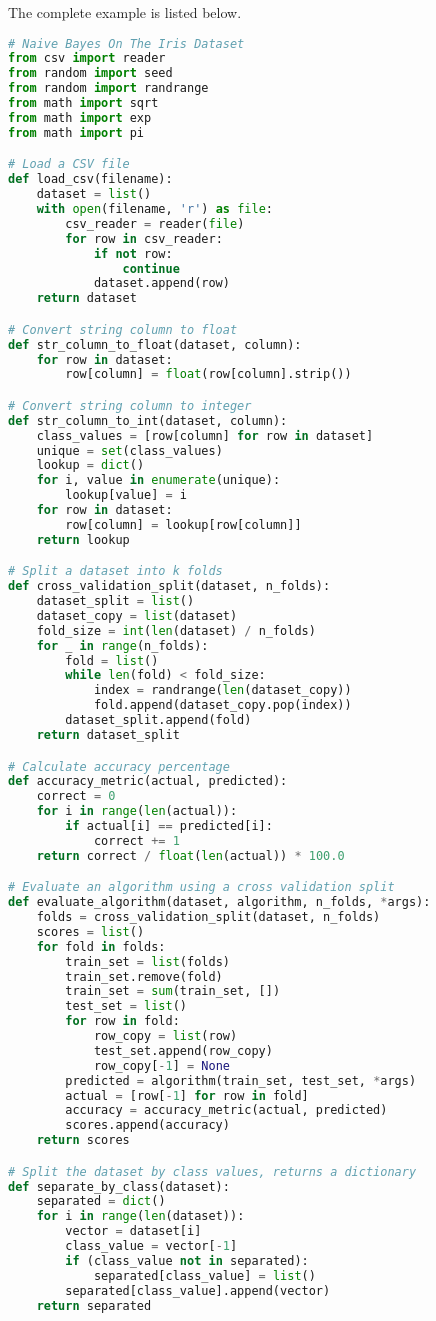 \documentclass[12pt]{article}
\begin{document}
The complete example is listed below.\\

\begin{lstlisting}[language=python]
# Naive Bayes On The Iris Dataset
from csv import reader
from random import seed
from random import randrange
from math import sqrt
from math import exp
from math import pi

# Load a CSV file
def load_csv(filename):
	dataset = list()
	with open(filename, 'r') as file:
		csv_reader = reader(file)
		for row in csv_reader:
			if not row:
				continue
			dataset.append(row)
	return dataset

# Convert string column to float
def str_column_to_float(dataset, column):
	for row in dataset:
		row[column] = float(row[column].strip())

# Convert string column to integer
def str_column_to_int(dataset, column):
	class_values = [row[column] for row in dataset]
	unique = set(class_values)
	lookup = dict()
	for i, value in enumerate(unique):
		lookup[value] = i
	for row in dataset:
		row[column] = lookup[row[column]]
	return lookup

# Split a dataset into k folds
def cross_validation_split(dataset, n_folds):
	dataset_split = list()
	dataset_copy = list(dataset)
	fold_size = int(len(dataset) / n_folds)
	for _ in range(n_folds):
		fold = list()
		while len(fold) < fold_size:
			index = randrange(len(dataset_copy))
			fold.append(dataset_copy.pop(index))
		dataset_split.append(fold)
	return dataset_split

# Calculate accuracy percentage
def accuracy_metric(actual, predicted):
	correct = 0
	for i in range(len(actual)):
		if actual[i] == predicted[i]:
			correct += 1
	return correct / float(len(actual)) * 100.0

# Evaluate an algorithm using a cross validation split
def evaluate_algorithm(dataset, algorithm, n_folds, *args):
	folds = cross_validation_split(dataset, n_folds)
	scores = list()
	for fold in folds:
		train_set = list(folds)
		train_set.remove(fold)
		train_set = sum(train_set, [])
		test_set = list()
		for row in fold:
			row_copy = list(row)
			test_set.append(row_copy)
			row_copy[-1] = None
		predicted = algorithm(train_set, test_set, *args)
		actual = [row[-1] for row in fold]
		accuracy = accuracy_metric(actual, predicted)
		scores.append(accuracy)
	return scores

# Split the dataset by class values, returns a dictionary
def separate_by_class(dataset):
	separated = dict()
	for i in range(len(dataset)):
		vector = dataset[i]
		class_value = vector[-1]
		if (class_value not in separated):
			separated[class_value] = list()
		separated[class_value].append(vector)
	return separated


\end{lstlisting}
\end{document}
